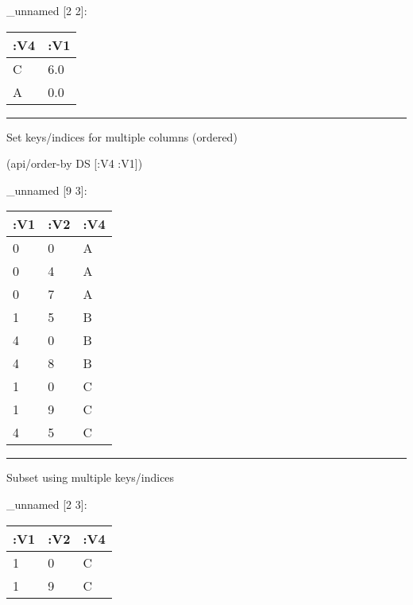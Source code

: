 \documentclass[]{article}
\newenvironment{Shaded}{\begin{snugshade}}{\end{snugshade}}
\newcommand{\AttributeTok}[1]{\textcolor[rgb]{0.77,0.63,0.00}{#1}}
\newcommand{\DecValTok}[1]{\textcolor[rgb]{0.00,0.00,0.81}{#1}}
\newcommand{\KeywordTok}[1]{\textcolor[rgb]{0.13,0.29,0.53}{\textbf{#1}}}
\newcommand{\NormalTok}[1]{#1}
\newcommand{\StringTok}[1]{\textcolor[rgb]{0.31,0.60,0.02}{#1}}
\newcommand{\VariableTok}[1]{\textcolor[rgb]{0.00,0.00,0.00}{#1}}
\begin{document}
\_unnamed {[}2 2{]}:

\begin{longtable}[]{@{}ll@{}}
\toprule
:V4 & :V1\tabularnewline
\midrule
\endhead
C & 6.0\tabularnewline
A & 0.0\tabularnewline
\bottomrule
\end{longtable}

\begin{center}\rule{0.5\linewidth}{0.5pt}\end{center}

Set keys/indices for multiple columns (ordered)

\begin{Shaded}
\begin{Highlighting}[]
\NormalTok{(api/order-by DS [}\AttributeTok{:V4} \AttributeTok{:V1}\NormalTok{])}
\end{Highlighting}
\end{Shaded}

\_unnamed {[}9 3{]}:

\begin{longtable}[]{@{}lll@{}}
\toprule
:V1 & :V2 & :V4\tabularnewline
\midrule
\endhead
0 & 0 & A\tabularnewline
0 & 4 & A\tabularnewline
0 & 7 & A\tabularnewline
1 & 5 & B\tabularnewline
4 & 0 & B\tabularnewline
4 & 8 & B\tabularnewline
1 & 0 & C\tabularnewline
1 & 9 & C\tabularnewline
4 & 5 & C\tabularnewline
\bottomrule
\end{longtable}

\begin{center}\rule{0.5\linewidth}{0.5pt}\end{center}

Subset using multiple keys/indices

\begin{Shaded}
\end{Shaded}

\_unnamed {[}2 3{]}:

\begin{longtable}[]{@{}lll@{}}
\toprule
:V1 & :V2 & :V4\tabularnewline
\midrule
\endhead
1 & 0 & C\tabularnewline
1 & 9 & C\tabularnewline
\bottomrule
\end{longtable}
\end{document}
